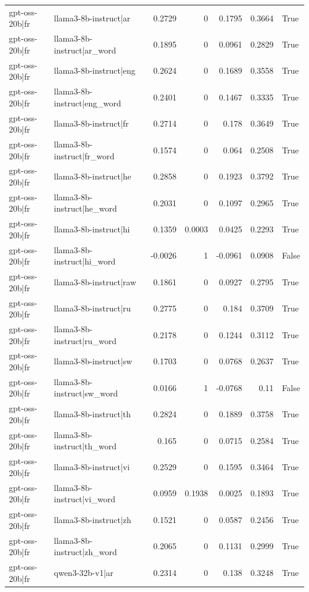\begin{table}
\begin{tabular}{l l r r r r l}
gpt-oss-20b|fr & llama3-8b-instruct|ar & 0.2729 & 0 & 0.1795 & 0.3664 & True \\
gpt-oss-20b|fr & llama3-8b-instruct|ar_word & 0.1895 & 0 & 0.0961 & 0.2829 & True \\
gpt-oss-20b|fr & llama3-8b-instruct|eng & 0.2624 & 0 & 0.1689 & 0.3558 & True \\
gpt-oss-20b|fr & llama3-8b-instruct|eng_word & 0.2401 & 0 & 0.1467 & 0.3335 & True \\
gpt-oss-20b|fr & llama3-8b-instruct|fr & 0.2714 & 0 & 0.178 & 0.3649 & True \\
gpt-oss-20b|fr & llama3-8b-instruct|fr_word & 0.1574 & 0 & 0.064 & 0.2508 & True \\
gpt-oss-20b|fr & llama3-8b-instruct|he & 0.2858 & 0 & 0.1923 & 0.3792 & True \\
gpt-oss-20b|fr & llama3-8b-instruct|he_word & 0.2031 & 0 & 0.1097 & 0.2965 & True \\
gpt-oss-20b|fr & llama3-8b-instruct|hi & 0.1359 & 0.0003 & 0.0425 & 0.2293 & True \\
gpt-oss-20b|fr & llama3-8b-instruct|hi_word & -0.0026 & 1 & -0.0961 & 0.0908 & False \\
gpt-oss-20b|fr & llama3-8b-instruct|raw & 0.1861 & 0 & 0.0927 & 0.2795 & True \\
gpt-oss-20b|fr & llama3-8b-instruct|ru & 0.2775 & 0 & 0.184 & 0.3709 & True \\
gpt-oss-20b|fr & llama3-8b-instruct|ru_word & 0.2178 & 0 & 0.1244 & 0.3112 & True \\
gpt-oss-20b|fr & llama3-8b-instruct|sw & 0.1703 & 0 & 0.0768 & 0.2637 & True \\
gpt-oss-20b|fr & llama3-8b-instruct|sw_word & 0.0166 & 1 & -0.0768 & 0.11 & False \\
gpt-oss-20b|fr & llama3-8b-instruct|th & 0.2824 & 0 & 0.1889 & 0.3758 & True \\
gpt-oss-20b|fr & llama3-8b-instruct|th_word & 0.165 & 0 & 0.0715 & 0.2584 & True \\
gpt-oss-20b|fr & llama3-8b-instruct|vi & 0.2529 & 0 & 0.1595 & 0.3464 & True \\
gpt-oss-20b|fr & llama3-8b-instruct|vi_word & 0.0959 & 0.1938 & 0.0025 & 0.1893 & True \\
gpt-oss-20b|fr & llama3-8b-instruct|zh & 0.1521 & 0 & 0.0587 & 0.2456 & True \\
gpt-oss-20b|fr & llama3-8b-instruct|zh_word & 0.2065 & 0 & 0.1131 & 0.2999 & True \\
gpt-oss-20b|fr & qwen3-32b-v1|ar & 0.2314 & 0 & 0.138 & 0.3248 & True \\

\end{tabular}
\end{table}
